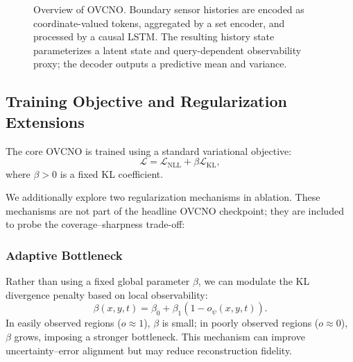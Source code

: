 \documentclass[11pt,a4paper]{article}
\begin{document}
\begin{figure}[!htbp]
{
    }
    \caption{Overview of OVCNO. Boundary sensor histories are encoded as coordinate-valued tokens, aggregated by a set encoder, and processed by a causal LSTM. The resulting history state parameterizes a latent state and query-dependent observability proxy; the decoder outputs a predictive mean and variance.}
    \label{fig:architecture}
\end{figure}

\subsection{Training Objective and Regularization Extensions}

The core OVCNO is trained using a standard variational objective:
\begin{equation}
\mathcal{L} = \mathcal{L}_{\mathrm{NLL}} + \beta \mathcal{L}_{\mathrm{KL}},
\end{equation}
where $\beta > 0$ is a fixed KL coefficient.

We additionally explore two regularization mechanisms in ablation. These mechanisms are not part of the headline OVCNO checkpoint; they are included to probe the coverage--sharpness trade-off:

\subsubsection{Adaptive Bottleneck}
Rather than using a fixed global parameter $\beta$, we can modulate the KL divergence penalty based on local observability:
\begin{equation}
\beta(x,y,t) = \beta_0 + \beta_1(1 - o_\psi(x,y,t)).
\end{equation}
In easily observed regions ($o \approx 1$), $\beta$ is small; in poorly observed regions ($o \approx 0$), $\beta$ grows, imposing a stronger bottleneck. This mechanism can improve uncertainty--error alignment but may reduce reconstruction fidelity.
\end{document}
